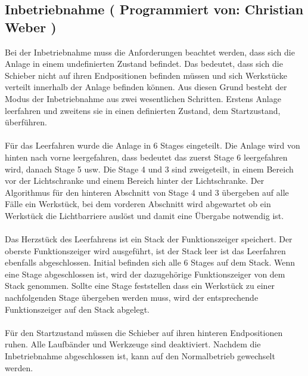 \documentclass[fontsize=11pt,a4paper,final]{scrartcl}[2003/01/01]
\newcommand*{\chris}{%
	Programmiert von: Christian Weber
}
\begin{document}
\subsection{Inbetriebnahme (\chris)}
Bei der Inbetriebnahme muss die Anforderungen beachtet werden, dass sich die Anlage in einem undefinierten Zustand befindet. Das bedeutet, dass sich die Schieber nicht auf ihren Endpositionen befinden müssen und sich Werkstücke verteilt innerhalb der Anlage befinden können. Aus diesen Grund besteht der Modus der Inbetriebnahme aus zwei wesentlichen Schritten. Erstens Anlage leerfahren und zweitens sie in einen definierten Zustand, dem Startzustand, überführen.\\
\\
Für das Leerfahren wurde die Anlage in 6 Stages eingeteilt. Die Anlage wird von hinten nach vorne leergefahren, dass bedeutet das zuerst Stage 6 leergefahren wird, danach Stage 5 usw. Die Stage 4 und 3 sind zweigeteilt, in einem Bereich vor der Lichtschranke und einem Bereich hinter der Lichtschranke. Der Algorithmus für den hinteren Abschnitt von Stage 4 und 3 übergeben auf alle Fälle ein Werkstück, bei dem vorderen Abschnitt wird abgewartet ob ein Werkstück die Lichtbarriere auslöst und damit eine Übergabe notwendig ist.\\
\\
Das Herzstück des Leerfahrens ist ein Stack der Funktionszeiger speichert. Der oberste Funktionszeiger wird ausgeführt, ist der Stack leer ist das Leerfahren ebenfalls abgeschlossen. Initial befinden sich alle 6 Stages auf dem Stack. Wenn eine Stage abgeschlossen ist, wird der dazugehörige Funktionszeiger von dem Stack genommen. Sollte eine Stage feststellen dass ein Werkstück zu einer nachfolgenden Stage übergeben werden muss, wird der entsprechende Funktionszeiger auf den Stack abgelegt.\\
\\
Für den Startzustand müssen die Schieber auf ihren hinteren Endpositionen ruhen. Alle Laufbänder und Werkzeuge sind deaktiviert. Nachdem die Inbetriebnahme abgeschlossen ist, kann auf den Normalbetrieb gewechselt werden.
\end{document}
